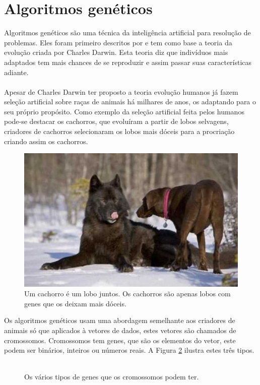 \documentclass[10pt,a4paper]{article}
\begin{document}
\section{Algoritmos genéticos}
Algoritmos genéticos são uma técnica da inteligência artificial para resolução de problemas. Eles foram primeiro descritos por \cite{primeiroAUsarAG} e tem como  base a teoria da evolução criada por Charles Darwin. Esta teoria diz que indivíduos mais adaptados tem mais chances de se reproduzir e assim passar suas características adiante. \\ \\
Apesar de Charles Darwin ter proposto a teoria evolução humanos já fazem seleção artificial sobre raças de animais há milhares de anos, os adaptando para o seu próprio propósito. Como exemplo da seleção artificial feita pelos humanos pode-se destacar os cachorros, que evoluíram a partir de lobos selvagens, criadores de cachorros selecionaram os lobos mais dóceis para a procriação criando assim os cachorros.\\ 
\begin{figure}[H]
  \center
  \includegraphics[scale=0.6]{imgs/cachorroELobo.jpg}            
  \caption{Um cachorro é um lobo juntos. Os cachorros são apenas lobos com genes que os deixam mais dóceis.}
  \label{fig:MostrandoOCruzamentoPorCorte}
\end{figure} 

Os algoritmos genéticos usam uma abordagem semelhante aos criadores de animais só que aplicados à vetores de dados, estes vetores são chamados de cromossomos. Cromossomos tem genes, que são os elementos do vetor, este podem ser binários, inteiros ou números reais. A Figura \ref{fig:ExemploDeVetores} ilustra estes três tipos.\\ \\
\begin{figure}[H]
  \center
  \caption{Os vários tipos de genes que os cromossomos podem ter.}
  \label{fig:ExemploDeVetores}
\end{figure} 
\end{document}
